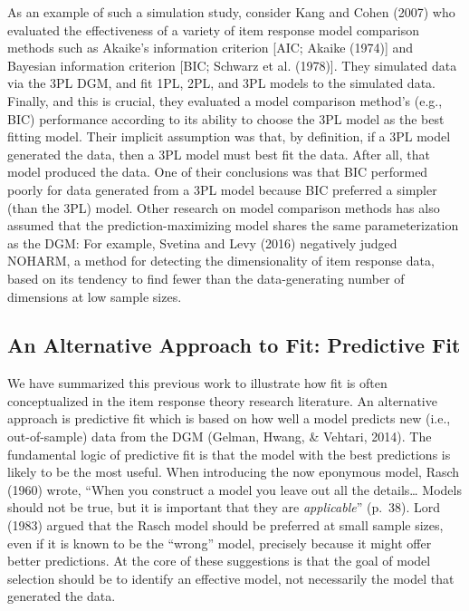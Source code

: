 \documentclass[
  english,
  man,floatsintext]{apa7}
\begin{document}
As an example of such a simulation study, consider Kang and Cohen (2007) who evaluated the effectiveness of a variety of item response model comparison methods such as Akaike's information criterion {[}AIC; Akaike (1974){]} and Bayesian information criterion {[}BIC; Schwarz et al. (1978){]}. They simulated data via the 3PL DGM, and fit 1PL, 2PL, and 3PL models to the simulated data. Finally, and this is crucial, they evaluated a model comparison method's (e.g., BIC) performance according to its ability to choose the 3PL model as the best fitting model. Their implicit assumption was that, by definition, if a 3PL model generated the data, then a 3PL model must best fit the data. After all, that model produced the data. One of their conclusions was that BIC performed poorly for data generated from a 3PL model because BIC preferred a simpler (than the 3PL) model. Other research on model comparison methods has also assumed that the prediction-maximizing model shares the same parameterization as the DGM: For example, Svetina and Levy (2016) negatively judged NOHARM, a method for detecting the dimensionality of item response data, based on its tendency to find fewer than the data-generating number of dimensions at low sample sizes.

\hypertarget{an-alternative-approach-to-fit-predictive-fit}{%
\subsection{An Alternative Approach to Fit: Predictive Fit}\label{an-alternative-approach-to-fit-predictive-fit}}

We have summarized this previous work to illustrate how fit is often conceptualized in the item response theory research literature. An alternative approach is predictive fit which is based on how well a model predicts new (i.e., out-of-sample) data from the DGM (Gelman, Hwang, \& Vehtari, 2014). The fundamental logic of predictive fit is that the model with the best predictions is likely to be the most useful. When introducing the now eponymous model, Rasch (1960) wrote, ``When you construct a model you leave out all the details\ldots{} Models should not be true, but it is important that they are \emph{applicable}'' (p.~38). Lord (1983) argued that the Rasch model should be preferred at small sample sizes, even if it is known to be the ``wrong'' model, precisely because it might offer better predictions. At the core of these suggestions is that the goal of model selection should be to identify an effective model, not necessarily the model that generated the data.
\end{document}
